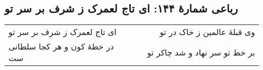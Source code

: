 \begin{center}
\section*{رباعی شمارهٔ ۱۴۴: ای تاج لعمرک ز شرف بر سر تو}
\label{sec:144}
\begin{longtable}{l p{0.5cm} r}
ای تاج لعمرک ز شرف بر سر تو
&&
وی قبلهٔ عالمین ز خاک در تو
\\
در خطهٔ کون و هر کجا سلطانی ست
&&
بر خط تو سر نهاد و شد چاکر تو
\\
\end{longtable}
\end{center}
